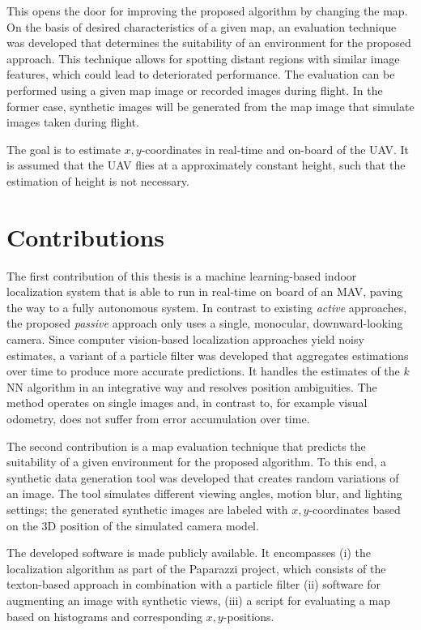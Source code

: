 This opens the door for improving the proposed
algorithm by changing the map. On the basis of desired characteristics
of a given map, an evaluation technique was developed that determines
the suitability of an environment for the proposed approach. This
technique allows for spotting distant regions with similar image
features, which could lead to deteriorated performance. The evaluation
can be performed using a given map image or recorded images during
flight. In the former case, synthetic images will be generated from
the map image that simulate images taken during flight.

The goal is to estimate $x,y$-coordinates in real-time and on-board of the UAV. It is assumed that the UAV flies at a approximately constant height, such that the estimation of height is not necessary.


\section{Contributions}
\label{sec:contributions}

The first contribution of this thesis is a machine learning-based
indoor localization system that is able to run in real-time on board
of an MAV, paving the way to a fully autonomous system. In contrast to
existing \emph{active} approaches, the proposed \emph{passive}
approach only uses a single, monocular, downward-looking camera. Since
computer vision-based localization approaches yield noisy estimates, a
variant of a particle filter was developed that aggregates estimations
over time to produce more accurate predictions. It handles the
estimates of the $k$NN algorithm in an integrative way and resolves
position ambiguities. The method operates on single images and, in
contrast to, for example visual odometry, does not suffer from error
accumulation over time.

The second contribution is a map evaluation technique that predicts
the suitability of a given environment for the proposed algorithm. To
this end, a synthetic data generation tool was developed that creates
random variations of an image. The tool simulates different viewing
angles, motion blur, and lighting settings; the generated synthetic
images are labeled with $x,y$-coordinates based on the 3D position of
the simulated camera model.

The developed software is made publicly available. It encompasses (i)
the localization algorithm as part of the Paparazzi project, which
consists of the texton-based approach in combination with a particle
filter (ii) software for augmenting an image with synthetic views,
(iii) a script for evaluating a map based on histograms and
corresponding $x,y$-positions.
